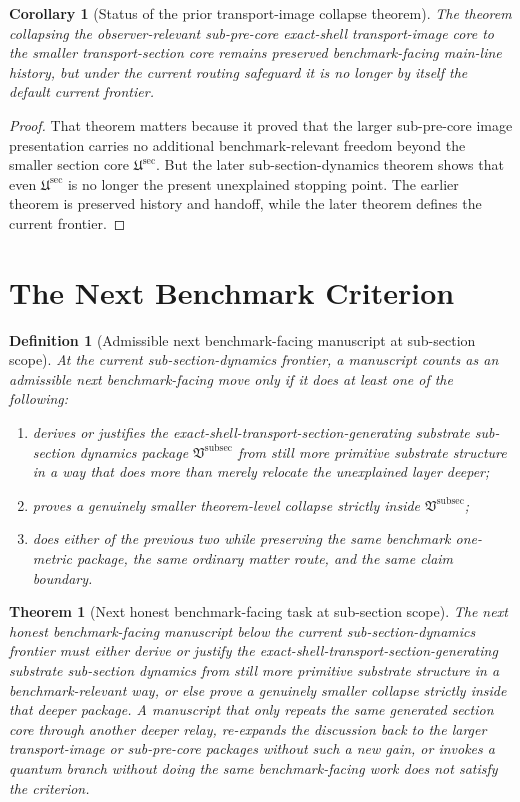 \documentclass[11pt]{article}
\newcommand{\SubPreSectionCore}{\mathfrak U^{\mathrm{sec}}}
\newcommand{\SubSectionPackage}{\mathfrak V^{\mathrm{subsec}}}
\newtheorem{definition}{Definition}
\newtheorem{corollary}{Corollary}
\newtheorem{theorem}{Theorem}
\begin{document}
\begin{corollary}[Status of the prior transport-image collapse theorem]
The theorem collapsing the observer-relevant sub-pre-core exact-shell transport-image core to the smaller transport-section core remains preserved benchmark-facing main-line history, but under the current routing safeguard it is no longer by itself the default current frontier.
\end{corollary}

\begin{proof}
That theorem matters because it proved that the larger sub-pre-core image presentation carries no additional benchmark-relevant freedom beyond the smaller section core \(\SubPreSectionCore\). But the later sub-section-dynamics theorem shows that even \(\SubPreSectionCore\) is no longer the present unexplained stopping point. The earlier theorem is preserved history and handoff, while the later theorem defines the current frontier.
\end{proof}

\section{The Next Benchmark Criterion}

\begin{definition}[Admissible next benchmark-facing manuscript at sub-section scope]
At the current sub-section-dynamics frontier, a manuscript counts as an admissible next benchmark-facing move only if it does at least one of the following:
\begin{enumerate}
    \item derives or justifies the exact-shell-transport-section-generating substrate sub-section dynamics package \(\SubSectionPackage\) from still more primitive substrate structure in a way that does more than merely relocate the unexplained layer deeper;
    \item proves a genuinely smaller theorem-level collapse strictly inside \(\SubSectionPackage\);
    \item does either of the previous two while preserving the same benchmark one-metric package, the same ordinary matter route, and the same claim boundary.
\end{enumerate}
\end{definition}

\begin{theorem}[Next honest benchmark-facing task at sub-section scope]
The next honest benchmark-facing manuscript below the current sub-section-dynamics frontier must either derive or justify the exact-shell-transport-section-generating substrate sub-section dynamics from still more primitive substrate structure in a benchmark-relevant way, or else prove a genuinely smaller collapse strictly inside that deeper package. A manuscript that only repeats the same generated section core through another deeper relay, re-expands the discussion back to the larger transport-image or sub-pre-core packages without such a new gain, or invokes a quantum branch without doing the same benchmark-facing work does not satisfy the criterion.
\end{theorem}
\end{document}
